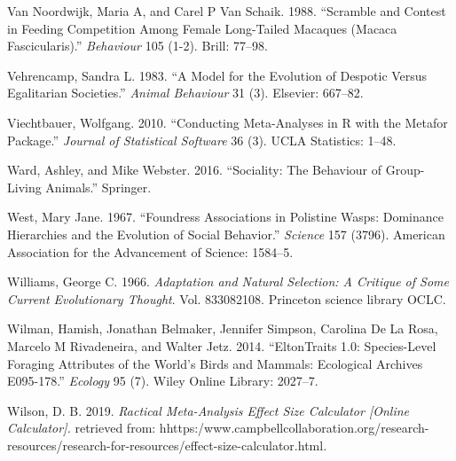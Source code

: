\documentclass[]{article}
\begin{document}
\leavevmode\hypertarget{ref-van1988scramble}{}%
Van Noordwijk, Maria A, and Carel P Van Schaik. 1988. ``Scramble and
Contest in Feeding Competition Among Female Long-Tailed Macaques (Macaca
Fascicularis).'' \emph{Behaviour} 105 (1-2). Brill: 77--98.

\leavevmode\hypertarget{ref-vehrencamp1983model}{}%
Vehrencamp, Sandra L. 1983. ``A Model for the Evolution of Despotic
Versus Egalitarian Societies.'' \emph{Animal Behaviour} 31 (3).
Elsevier: 667--82.

\leavevmode\hypertarget{ref-viechtbauer2010conducting}{}%
Viechtbauer, Wolfgang. 2010. ``Conducting Meta-Analyses in R with the
Metafor Package.'' \emph{Journal of Statistical Software} 36 (3). UCLA
Statistics: 1--48.

\leavevmode\hypertarget{ref-ward2016sociality}{}%
Ward, Ashley, and Mike Webster. 2016. ``Sociality: The Behaviour of
Group-Living Animals.'' Springer.

\leavevmode\hypertarget{ref-west1967foundress}{}%
West, Mary Jane. 1967. ``Foundress Associations in Polistine Wasps:
Dominance Hierarchies and the Evolution of Social Behavior.''
\emph{Science} 157 (3796). American Association for the Advancement of
Science: 1584--5.

\leavevmode\hypertarget{ref-williams1966adaptation}{}%
Williams, George C. 1966. \emph{Adaptation and Natural Selection: A
Critique of Some Current Evolutionary Thought}. Vol. 833082108.
Princeton science library OCLC.

\leavevmode\hypertarget{ref-wilman2014eltontraits}{}%
Wilman, Hamish, Jonathan Belmaker, Jennifer Simpson, Carolina De La
Rosa, Marcelo M Rivadeneira, and Walter Jetz. 2014. ``EltonTraits 1.0:
Species-Level Foraging Attributes of the World's Birds and Mammals:
Ecological Archives E095-178.'' \emph{Ecology} 95 (7). Wiley Online
Library: 2027--7.

\leavevmode\hypertarget{ref-wilson2019calculator}{}%
Wilson, D. B. 2019. \emph{Ractical Meta-Analysis Effect Size Calculator
{[}Online Calculator{]}.} retrieved from:
hhttps:/www.campbellcollaboration.org/research-resources/research-for-resources/effect-size-calculator.html.
\end{document}
